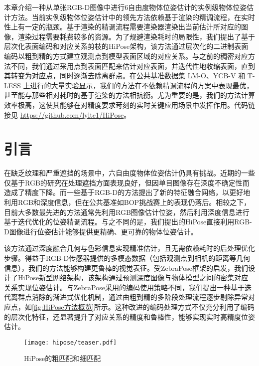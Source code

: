 本章介绍一种从单张RGB-D图像中进行6自由度物体位姿估计的实例级物体位姿估计方法。当前实例级物体位姿估计中的领先方法\cite{Sundermeyer2023BOPC2}依赖基于渲染的精调流程，在实时性上有一定的瓶颈。基于渲染的精调流程需要渲染器渲染出当前估计所对应的图像，渲染过程需要耗费较多的资源。为了规避渲染耗时的局限性，我们提出了基于层次化表面编码和对应关系剪枝的HiPose架构，该方法通过层次化的二进制表面编码以粗到精的方式建立观测点到模型表面区域的对应关系。与之前的稠密对应方法不同，我们通过采用点到表面匹配来估计对应表面，并迭代性地收缩表面，直到其转变为对应点，同时逐渐去除离群点。在公共基准数据集 LM-O、YCB-V 和 T-LESS 上进行的大量实验显示，我们的方法在不依赖精调流程的方案中表现最优，甚至能与那些相对耗时的基于渲染的方法相抗衡。尤为重要的是，我们的方法计算效率极高，这使其能够在对精度要求苛刻的实时关键应用场景中发挥作用。代码链接见 \url{https://github.com/lyltc1/HiPose}。

\section{引言}
在缺乏纹理和严重遮挡的场景中，六自由度物体位姿估计仍具有挑战。近期的一些仅基于RGB的研究\cite{su2022zebrapose}在处理遮挡方面表现良好，但因单目图像存在深度不确定性而造成了精度下降。而一些基于RGB-D的方法\cite{wang2019densefusion,he2020pvn3d,he2021ffb6d,zhou2023deep}提出了新的特征融合网络，以更好地利用RGB和深度信息，但在公共基准如BOP挑战赛\cite{Sundermeyer2023BOPC2}上的表现仍落后。相较之下，目前大多数最先进的方法通常先利用RGB图像估计位姿，然后利用深度信息进行基于迭代优化的位姿精调流程\cite{Rusinkiewicz2001EfficientVO,lipson2022coupled}。与之不同的是，我们提出的HiPose直接利用RGB-D图像进行位姿估计能够提供更精确、更可靠的物体位姿估计。

该方法通过深度融合几何与色彩信息实现精准估计，且无需依赖耗时的后处理优化步骤。得益于RGB-D传感器提供的多模态数据（包括观测点到相机的距离等几何信息），我们的方法能够构建更鲁棒的视觉表征。受ZebraPose\cite{su2022zebrapose}框架的启发，我们设计了HiPose新型网络架构，该架构通过预测深度图像与物体模型之间的密集对应关系实现位姿估计。与ZebraPose采用的编码使用策略不同，我们提出一种基于迭代离群点消除的渐进式优化机制，通过由粗到精的多阶段处理流程逐步剔除异常对应点，如\autoref{fig:HiPose方法概览}所示。这种改进的编码处理方式不仅充分利用了编码的层次化特征，还显著提升了对应关系的精度和鲁棒性，能够实现实时高精度位姿估计。

\begin{figure}[ht]
    \centering
    \texttt{[image: hipose/teaser.pdf]}
    \caption{HiPose的粗匹配和细匹配}
    \label{fig:HiPose方法概览}
\end{figure}

